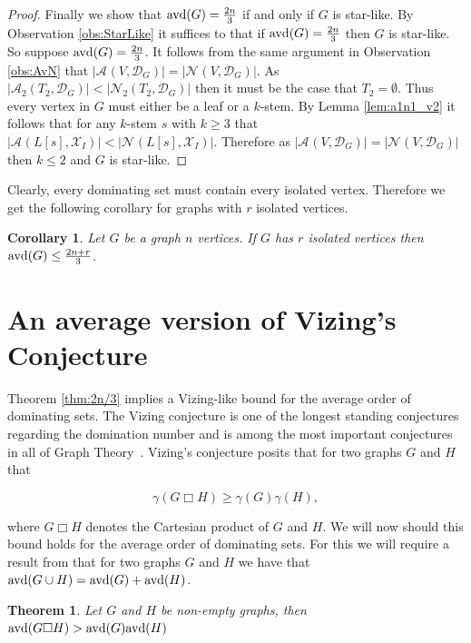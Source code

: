 \documentclass[11pt]{article}
\newtheorem{theorem}[definition]{Theorem}
\newtheorem{corollary}[definition]{Corollary}
\newcommand{\avd}{\text{\rm{avd}}}
\newcommand{\A}[3][\mathcal{D}_G]{\mathcal{A}_{#3}(#2, #1)}
\newcommand{\N}[3][\mathcal{D}_G]{\mathcal{N}_{#3}(#2, #1)}
\begin{document}
\begin{proof}
Finally we show that $\avd(G) = \frac{2n}{3}$ if and only if $G$ is star-like. By Observation \ref{obs:StarLike} it suffices to that if $\avd(G) = \frac{2n}{3}$ then $G$ is star-like. So suppose $\avd(G) = \frac{2n}{3}$. It follows from the same argument in Observation \ref{obs:AvN} that $|\A{V}{}| = |\N{V}{}|$. As $|\A{T_2}{2}| < |\N{T_2}{2}|$ then it must be the case that $T_2 = \emptyset$. Thus every vertex in $G$ must either be a leaf or a $k$-stem. By Lemma \ref{lem:a1n1_v2} it follows that for any $k$-stem $s$ with $k \geq 3$ that $|\A[\mathcal{X}_{I}]{L[s]}{}| < |\N[\mathcal{X}_{I}]{L[s]}{}|$.
Therefore as $|\A{V}{}| = |\N{V}{}|$ then $k \leq 2$ and $G$ is star-like.
\end{proof}

Clearly, every dominating set must contain every isolated vertex. Therefore we get the following corollary for graphs with $r$ isolated vertices.

\begin{corollary}
\label{cor:2n3boundwithiso}
Let $G$ be a graph $n$ vertices. If $G$ has $r$ isolated vertices then $\avd(G) \leq \frac{2n+r}{3}$.
\end{corollary}

\section{An average version of Vizing's Conjecture}\label{sec:Vizing}
Theorem \ref{thm:2n/3} implies a Vizing-like bound for the average order of dominating sets. The Vizing conjecture \cite{VizingConjecture} is one of the longest standing conjectures regarding the domination number and is among the most important conjectures in all of Graph Theory~\cite{BonatoNowakowski2012}. Vizing's conjecture posits that for two graphs $G$ and $H$ that

$$\gamma(G \Box H) \geq \gamma(G)\gamma(H),$$

\noindent where $G \Box H$ denotes the Cartesian product of $G$ and $H$. We will now should this bound holds for the average order of dominating sets. For this we will require a result from \cite{2021Beaton} that for two graphs $G$ and $H$ we have that $\avd(G \cup H) = \avd(G) + \avd(H)$.

\begin{theorem}
\label{thm:VizingAvd}
Let $G$ and $H$ be non-empty graphs, then $\avd(G \Box H) > \avd(G)\avd(H)$

\end{theorem}
\end{document}
